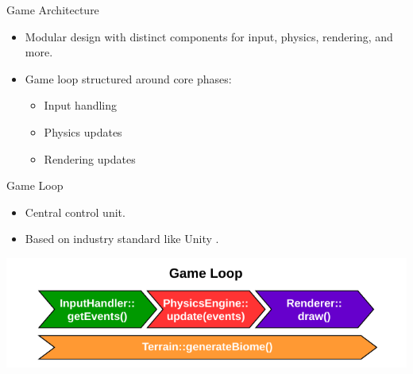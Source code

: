
\begin{frame}{Game Architecture}
    \begin{itemize}
        \item Modular design with distinct components for input, physics, rendering, and more.
        \item Game loop structured around core phases:
        \begin{itemize}
            \item Input handling
            \item Physics updates
            \item Rendering updates
        \end{itemize}
    \end{itemize}
\end{frame}

\begin{frame}{Game Loop}
    \begin{itemize}
        \item Central control unit.
        \item Based on industry standard like Unity \cite{nystromGameLoop,unityGameLoop}.
    \end{itemize}
    \centering
    \includegraphics[width=\textwidth]{../figures/physics/gameLoop.pdf}
\end{frame}